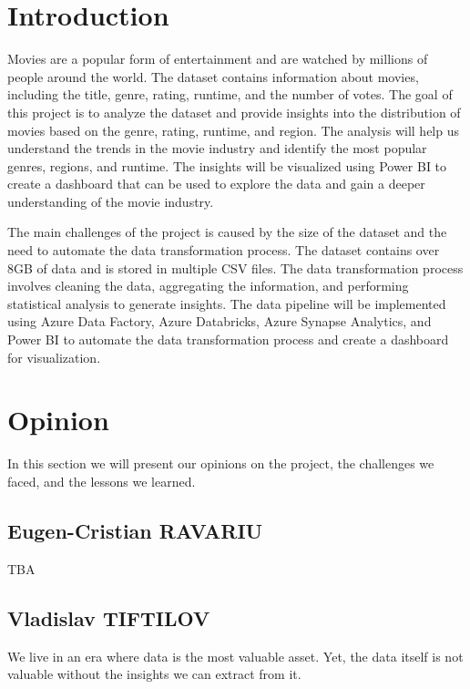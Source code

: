 \documentclass[a4paper,12pt]{article}
\begin{document}
\newpage
\tableofcontents  %
\newpage

\section{Introduction}
\label{sec:introduction}

Movies are a popular form of entertainment and are watched by millions of people around the world. 
The dataset contains information about movies, including the title, genre, rating, runtime, and the 
number of votes. The goal of this project is to analyze the dataset and provide insights into the 
distribution of movies based on the genre, rating, runtime, and region. The analysis will help us 
understand the trends in the movie industry and identify the most popular genres, regions, and runtime. 
The insights will be visualized using Power BI to create a dashboard that can be used to explore the 
data and gain a deeper understanding of the movie industry.

The main challenges of the project is caused by the size of the dataset and the need to automate 
the data transformation process. The dataset contains over 8GB of data and is stored in multiple 
CSV files. The data transformation process involves cleaning the data, aggregating the information, 
and performing statistical analysis to generate insights. The data pipeline will be implemented using 
Azure Data Factory, Azure Databricks, Azure Synapse Analytics, and Power BI to automate the data 
transformation process and create a dashboard for visualization.

\section{Opinion}
\label{sec:opinion}

In this section we will present our opinions on the project, the challenges we faced, and the lessons we learned.

\subsection{Eugen-Cristian RAVARIU}

TBA

\subsection{Vladislav TIFTILOV}

We live in an era where data is the most valuable asset. Yet, the data itself is not valuable without the insights we can extract from it.
\end{document}
